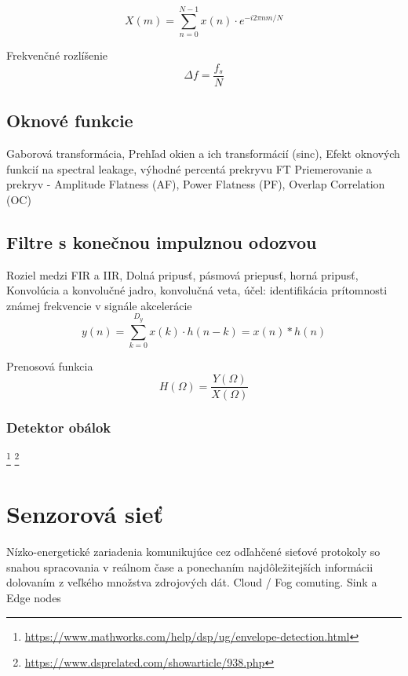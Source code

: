 \begin{equation}
X(m) = \sum_{n = 0}^{N-1}{x(n) \cdot e^{-i2\pi n m / N}}
\end{equation}

Frekvenčné rozlíšenie
\begin{equation}
\Delta f = \frac{f_s}{N}
\end{equation}

\subsection{Oknové funkcie}
Gaborová transformácia, Prehľad okien a ich transformácií (sinc), Efekt oknových funkcií na spectral leakage, výhodné percentá prekryvu FT 	\cite{understanding-dsp} \cite{spectral-density-estimation}
Priemerovanie a prekryv - Amplitude Flatness (AF), Power Flatness (PF), Overlap Correlation (OC)

\subsection{Filtre s konečnou impulznou odozvou}
Roziel medzi FIR a IIR, Dolná pripusť, pásmová priepusť, horná pripusť,
 Konvolúcia a konvolučné jadro, konvolučná veta, účel: identifikácia prítomnosti známej frekvencie v signále akcelerácie
\begin{equation}
y(n) = \sum_{k=0}^{D_y}{x(k) \cdot h(n-k)} = x(n) * h(n)
\end{equation}

Prenosová funkcia
\begin{equation}
H(\Omega) = \frac{Y(\Omega)}{X(\Omega)}
\end{equation}	

\subsubsection{Detektor obálok}
\footnote{\url{https://www.mathworks.com/help/dsp/ug/envelope-detection.html}}
\footnote{\url{https://www.dsprelated.com/showarticle/938.php}}

\section{Senzorová sieť}
Nízko-energetické zariadenia komunikujúce cez odľahčené sieťové protokoly so snahou spracovania v reálnom čase a ponechaním najdôležitejších informácii dolovaním z veľkého množstva zdrojových dát. Cloud / Fog comuting. Sink a Edge nodes

